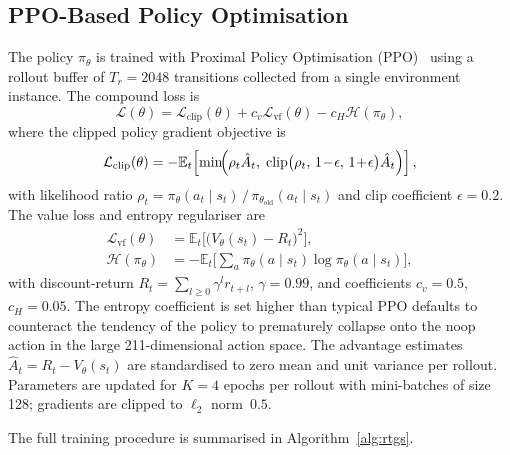 \subsection{PPO-Based Policy Optimisation}
\label{subsec:ppo}

The policy $\pi_\theta$ is trained with Proximal Policy
Optimisation (PPO)~\cite{schulman2017proximal} using a rollout
buffer of $T_r = 2048$ transitions collected from a single
environment instance.
The compound loss is
\begin{equation}
  \mathcal{L}(\theta) =
    \mathcal{L}_{\mathrm{clip}}(\theta)
    + c_v \mathcal{L}_{\mathrm{vf}}(\theta)
    - c_H \mathcal{H}(\pi_\theta),
  \label{eq:ppo_loss}
\end{equation}
where the clipped policy gradient objective is
\begin{equation}
  \mathcal{L}_{\mathrm{clip}}(\theta) =
    -\mathbb{E}_t\!\left[
      \min\!\Bigl(
        \rho_t \hat{A}_t,\;
        \mathrm{clip}\bigl(\rho_t,\,1\!-\!\epsilon,\,1\!+\!\epsilon\bigr)\hat{A}_t
      \Bigr)
    \right],
  \label{eq:ppo_clip}
\end{equation}
with likelihood ratio
$\rho_t = \pi_\theta(a_t \mid s_t)\,/\,\pi_{\theta_{\mathrm{old}}}(a_t \mid s_t)$
and clip coefficient $\epsilon = 0.2$.
The value loss and entropy regulariser are
\begin{align}
  \mathcal{L}_{\mathrm{vf}}(\theta)
    &= \mathbb{E}_t\!\bigl[\bigl(V_\theta(s_t) - R_t\bigr)^2\bigr],
  \label{eq:vf_loss}\\
  \mathcal{H}(\pi_\theta)
    &= -\mathbb{E}_t\!\bigl[
        \sum_a \pi_\theta(a \mid s_t)\log\pi_\theta(a \mid s_t)
      \bigr],
  \label{eq:entropy}
\end{align}
with discount-return $R_t = \sum_{l \geq 0} \gamma^l r_{t+l}$,
$\gamma = 0.99$, and coefficients $c_v = 0.5$, $c_H = 0.05$.
The entropy coefficient is set higher than typical PPO defaults to
counteract the tendency of the policy to prematurely collapse onto
the noop action in the large 211-dimensional action space.
The advantage estimates $\hat{A}_t = R_t - V_\theta(s_t)$ are
standardised to zero mean and unit variance per rollout.
Parameters are updated for $K = 4$ epochs per rollout with
mini-batches of size 128; gradients are clipped to $\ell_2$
norm~$0.5$.

The full training procedure is summarised in
Algorithm~\ref{alg:rtgs}.

